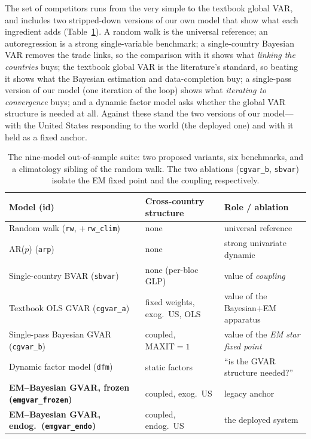 \documentclass[11pt]{article}
\newcommand{\code}[1]{\texttt{\small #1}}
\begin{document}
The set of competitors runs from the very simple to the textbook global VAR, and includes two
stripped-down versions of our own model that show what each ingredient adds (Table~\ref{tab:bench}). A
random walk is the universal reference; an autoregression is a strong single-variable benchmark; a
single-country Bayesian VAR removes the trade links, so the comparison with it shows what \emph{linking
the countries} buys; the textbook global VAR is the literature's standard, so beating it shows what the
Bayesian estimation and data-completion buy; a single-pass version of our model (one iteration of the
loop) shows what \emph{iterating to convergence} buys; and a dynamic factor model asks whether the global
VAR structure is needed at all. Against these stand the two versions of our model---with the United States
responding to the world (the deployed one) and with it held as a fixed anchor.

\begin{table}[t]
\centering
\caption{The nine-model out-of-sample suite: two proposed variants, six benchmarks, and a climatology
sibling of the random walk. The two ablations (\code{cgvar\_b}, \code{sbvar}) isolate the EM fixed point
and the coupling respectively.}
\label{tab:bench}
\begin{tabular}{@{}lll@{}}
\toprule
Model (id) & Cross-country structure & Role / ablation \\
\midrule
Random walk (\code{rw}, +\,\code{rw\_clim})   & none                       & universal reference \\
AR($p$) (\code{arp})                          & none                       & strong univariate dynamic \\
Single-country BVAR (\code{sbvar})            & none (per-bloc GLP)        & value of \emph{coupling} \\
Textbook OLS GVAR (\code{cgvar\_a})           & fixed weights, exog.\ US, OLS & value of the Bayesian$+$EM apparatus \\
Single-pass Bayesian GVAR (\code{cgvar\_b})   & coupled, $\text{MAXIT}=1$  & value of the \emph{EM star fixed point} \\
Dynamic factor model (\code{dfm})             & static factors             & ``is the GVAR structure needed?'' \\
\textbf{EM--Bayesian GVAR, frozen (\code{emgvar\_frozen})} & coupled, exog.\ US & legacy anchor \\
\textbf{EM--Bayesian GVAR, endog.\ (\code{emgvar\_endo})}  & coupled, endog.\ US & the deployed system \\
\bottomrule
\end{tabular}
\end{table}
\end{document}
